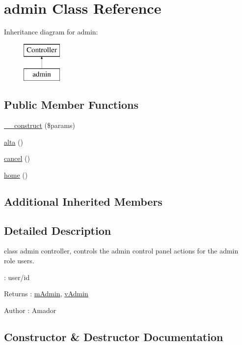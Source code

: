 \hypertarget{classadmin}{}\section{admin Class Reference}
\label{classadmin}
Inheritance diagram for admin\+:\begin{figure}[H]
\begin{center}
\leavevmode
\includegraphics[height=2.000000cm]{classadmin}
\end{center}
\end{figure}
\subsection*{Public Member Functions}
\begin{DoxyCompactItemize}
\item 
\hyperlink{classadmin_add908bb76c22245fc99a7f4a3b73d515}{\+\_\+\+\_\+construct} (\$params)
\item 
\hyperlink{classadmin_a76ed3203c2e9c21f646f9e01aebd18ca}{alta} ()
\item 
\hyperlink{classadmin_ae6d88faf502f1dd26815e030a38cd4d1}{cancel} ()
\item 
\hyperlink{classadmin_af8ce111506490f8145ea6ed9c90b7696}{home} ()
\end{DoxyCompactItemize}
\subsection*{Additional Inherited Members}


\subsection{Detailed Description}
class admin controller, controls the admin control panel actions for the admin role users.

\+: user/id \begin{DoxyReturn}{Returns}
\+: \hyperlink{classmAdmin}{m\+Admin}, \hyperlink{classvAdmin}{v\+Admin} 
\end{DoxyReturn}
\begin{DoxyAuthor}{Author}
\+: Amador 
\end{DoxyAuthor}


\subsection{Constructor \& Destructor Documentation}
\hypertarget{classadmin_add908bb76c22245fc99a7f4a3b73d515}{}
